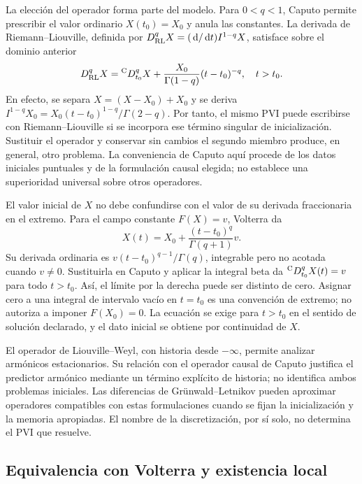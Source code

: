 La elección del operador forma parte del modelo. Para $0<q<1$, Caputo
permite prescribir el valor ordinario $X(t_0)=X_0$ y anula las constantes.
La derivada de Riemann--Liouville, definida por
$D_{\rm RL}^qX=(\,\mathrm d/\,\mathrm d t)I^{1-q}X$, satisface sobre el dominio anterior
\begin{equation}
 D_{\rm RL}^qX={}^{\mathrm C}D_{t_0}^{q}X+
 \frac{X_0}{\Gamma(1-q)}(t-t_0)^{-q},\quad t>t_0.
 \label{bre:fund:RLbridge}
\end{equation}
En efecto, se separa $X=(X-X_0)+X_0$ y se deriva
$I^{1-q}X_0=X_0(t-t_0)^{1-q}/\Gamma(2-q)$.
Por tanto, el mismo PVI puede escribirse con Riemann--Liouville si se
incorpora ese término singular de inicialización. Sustituir el operador
y conservar sin cambios el segundo miembro produce, en general, otro
problema. La conveniencia de Caputo aquí procede de los datos iniciales
puntuales y de la formulación causal elegida; no establece una superioridad
universal sobre otros operadores.

El valor inicial de $X$ no debe confundirse con el valor de su derivada
fraccionaria en el extremo. Para el campo constante $F(X)=v$, Volterra da
\begin{equation}
 X(t)=X_0+\frac{(t-t_0)^q}{\Gamma(q+1)}v.
 \label{bre:fund:startupconstant}
\end{equation}
Su derivada ordinaria es $v(t-t_0)^{q-1}/\Gamma(q)$, integrable pero
no acotada cuando $v\ne0$. Sustituirla en Caputo y aplicar la integral beta
da ${}^{\mathrm C}D_{t_0}^{q}X(t)=v$ para todo $t>t_0$. Así, el límite por la derecha
puede ser distinto de cero. Asignar cero a una integral de intervalo vacío
en $t=t_0$ es una convención de extremo; no autoriza a imponer
$F(X_0)=0$. La ecuación se exige para $t>t_0$ en el sentido de solución
declarado, y el dato inicial se obtiene por continuidad de $X$.

El operador de Liouville--Weyl, con historia desde $-\infty$, permite
analizar armónicos estacionarios. Su relación con el operador causal de
Caputo justifica el predictor armónico mediante un término explícito de
historia; no identifica ambos problemas iniciales. Las diferencias de
Grünwald--Letnikov pueden aproximar operadores compatibles con estas
formulaciones cuando se fijan la inicialización y la memoria apropiadas.
El nombre de la discretización, por sí solo, no determina el PVI que resuelve.

\subsection{Equivalencia con Volterra y existencia local}

